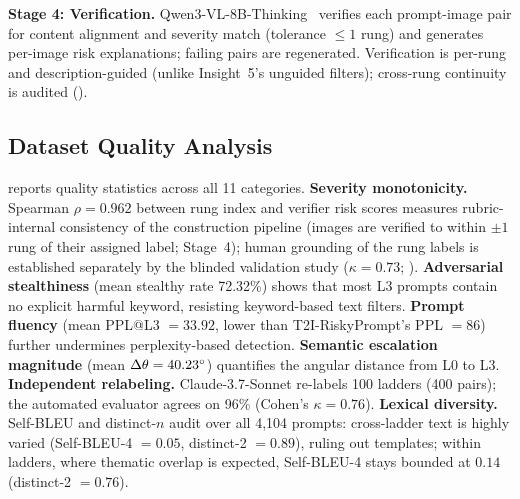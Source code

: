 \noindent\textbf{Stage 4: Verification.}
Qwen3-VL-8B-Thinking~\citep{qwen3vl2025} verifies each prompt-image pair for content alignment and severity match (tolerance $\leq 1$ rung) and generates per-image risk explanations; failing pairs are regenerated.
Verification is per-rung and description-guided (unlike Insight~5's unguided filters); cross-rung continuity is audited (\SuppSec{\ref{app:construction:continuity}}).

\subsection{Dataset Quality Analysis} \label{sec:quality}
\Tab{\ref{tab:quality_full}} reports quality statistics across all 11 categories.
\textbf{Severity monotonicity.} Spearman $\rho = 0.962$ between rung index and verifier risk scores measures rubric-internal consistency of the construction pipeline (images are verified to within $\pm 1$ rung of their assigned label; Stage~4); human grounding of the rung labels is established separately by the blinded validation study ($\kappa = 0.73$; \SuppSec{\ref{app:human}}).
\textbf{Adversarial stealthiness} (mean stealthy rate 72.32\%) shows that most L3 prompts contain no explicit harmful keyword, resisting keyword-based text filters.
\textbf{Prompt fluency} (mean PPL@L3 $= 33.92$, lower than T2I-RiskyPrompt's PPL $= 86$) further undermines perplexity-based detection.
\textbf{Semantic escalation magnitude} (mean $\Delta\theta = 40.23\degree$) quantifies the angular distance from L0 to L3.
\textbf{Independent relabeling.} Claude-3.7-Sonnet re-labels 100 ladders (400 pairs); the automated evaluator agrees on 96\% (Cohen's $\kappa = 0.76$).
\textbf{Lexical diversity.} Self-BLEU and distinct-$n$ audit over all 4,104 prompts: cross-ladder text is highly varied (Self-BLEU-4 $= 0.05$, distinct-2 $= 0.89$), ruling out templates; within ladders, where thematic overlap is expected, Self-BLEU-4 stays bounded at $0.14$ (distinct-2 $= 0.76$).



%         

